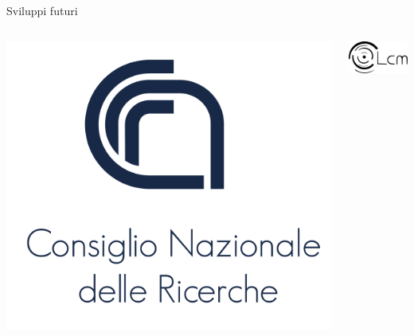 \documentclass[8pt]{beamer}
\begin{document}
\begin{frame}{Sviluppi futuri}
\begin{columns}
\begin{center}
			\includegraphics[width=\textwidth]{beam_cnr_logo.png}
		\end{center}
		\begin{center}
			\includegraphics[width=\textwidth]{beam_lcm_logo.png}
		\end{center}											
	\end{columns}
\end{frame}

\appendix	
\begin{frame}

\end{frame}


\end{document}
